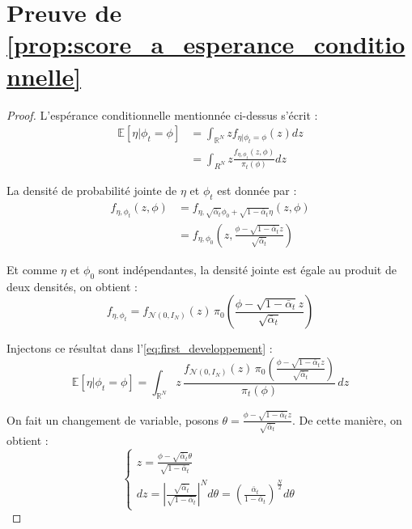 \documentclass[a4paper,10pt]{article}
\theoremstyle{definition} %
\theoremstyle{definition} %
\theoremstyle{definition} %
\theoremstyle{definition} %
\newcommand{\E}[1]{\mathbb{E}\left[#1\right]}
\newcommand{\R}{\mathbb{R}}
\begin{document}
\section{Preuve de \cref{prop:score_a_esperance_conditionnelle}}\label{sec:proof_score_a_esperance_conditionnelle}
\begin{proof}
    L'espérance conditionnelle mentionnée ci-dessus s'écrit :
    \begin{align}
        \E{\eta|\phi_t = \phi} &= \int_{\R^N} z f_{\eta|\phi_t=\phi}(z) dz \nonumber\\
        &= \int_{R^N} z \frac{f_{\eta,\phi_t}(z,\phi)}{\pi_t(\phi)}dz \label{eq:first_developpement} 
    \end{align}

    La densité de probabilité jointe de $\eta$ et $\phi_t$ est donnée par :
    \begin{align*}
        f_{\eta,\phi_t}(z,\phi) &= f_{\eta,\sqrt{\bar \alpha_t}\phi_0 + \sqrt{1-\bar\alpha_t}\eta }(z,\phi) \\
        &= f_{\eta,\phi_0}\left(z,\frac{\phi-\sqrt{1-\bar \alpha_t} z}{\sqrt{\bar \alpha_t}}\right)
    \end{align*}

    Et comme $\eta$ et $\phi_0$ sont indépendantes, la densité jointe est égale au produit de deux densités, on obtient :
    \begin{equation*}
        f_{\eta,\phi_t} = f_{\mathcal{N}(0,I_N)}(z) \,\pi_0\left(\frac{\phi-\sqrt{1-\bar \alpha_t} z}{\sqrt{\bar \alpha_t}}\right)
    \end{equation*}

    Injectons ce résultat dans l'\cref{eq:first_developpement} :
    \begin{equation*}
        \E{\eta|\phi_t = \phi}=\int_{\R^N} z \,\frac{f_{\mathcal{N}(0,I_N)}(z) \,\pi_0\left(\frac{\phi-\sqrt{1-\bar \alpha_t} z}{\sqrt{\bar \alpha_t}}\right)}{\pi_t(\phi)}\, dz
    \end{equation*}

    On fait un changement de variable, posons $\theta = \frac{\phi-\sqrt{1-\bar \alpha_t} z}{\sqrt{\bar \alpha_t}}$. De cette manière, on obtient :
    \begin{equation*}
        \begin{cases}    
            z = \frac{\phi-\sqrt{\bar \alpha_t}\theta}{\sqrt{1-\bar\alpha_t}} \\
            dz = \left| \frac{\sqrt{\bar \alpha_t}}{\sqrt{1-\bar\alpha_t}}\right|^N d\theta = \left( \frac{\bar \alpha_t}{1-\bar\alpha_t}\right)^\frac{N}{2}d\theta
        \end{cases}
    \end{equation*}


\end{proof}
\end{document}
